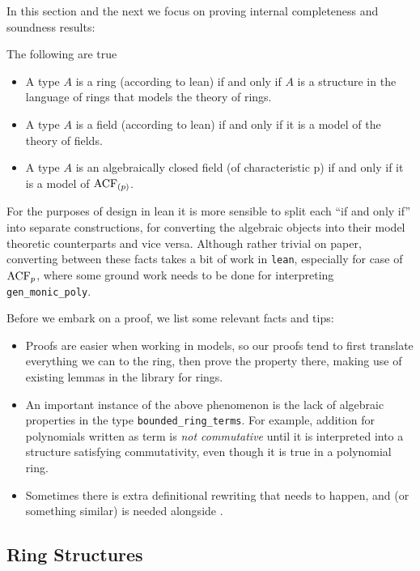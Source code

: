 In this section and the next we focus on proving internal
completeness and soundness results:
\begin{prop}
  The following are true
  \begin{itemize}
    \item A type $A$ is a ring (according to lean) if and only if
          $A$ is a structure in the language of rings
          that models the theory of rings.
    \item A type $A$ is a field (according to lean) if and only if
          it is a model of the theory of fields.
    \item A type $A$ is an algebraically closed field (of characteristic p)
          if and only if it is a model of $\operatorname{ACF}_{(p)}$.
  \end{itemize}
  For the purposes of design in lean it is
  more sensible to split each ``if and only if'' into separate constructions,
  for converting the algebraic objects into their model theoretic counterparts
  and vice versa.
  Although rather trivial on paper,
  converting between these facts takes a bit of work in \texttt{lean},
  especially for case of $\operatorname{ACF}_{p}$,
  where some ground work needs to be done for interpreting \texttt{gen\_monic\_poly}.
\end{prop}

Before we embark on a proof, we list some relevant facts and tips:
\begin{itemize}
  \item Proofs are easier when working in models, so our proofs tend to
        first translate everything we can to the ring,
        then prove the property there,
        making use of existing lemmas in the library for rings.
  \item An important instance of the above phenomenon is the lack
        of algebraic properties in the type \texttt{bounded\_ring\_terms}.
        For example, addition for polynomials written as term
        is \textit{not commutative} until it is interpreted into a structure
        satisfying commutativity,
        even though it is true in a polynomial ring.
  \item Sometimes there is extra definitional rewriting that needs to happen,
        and  (or something similar) is needed alongside .
\end{itemize}

\subsection{Ring Structures}

